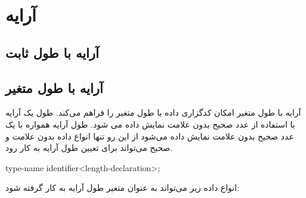 
\chapter{آرایه}

\section{آرایه با طول ثابت}

% 
% 
% 
% 

\section{آرایه با طول متغیر}

آرایه با طول متغیر امکان کدگزاری داده با طول متغیر را فراهم می‌کند.
طول یک آرایه با استفاده از عدد صحیح بدون علامت نمایش داده می شود.
طول آرایه همواره با یک عدد صحیح بدون علامت نمایش داده می‌شود از این رو تنها
انواع داده بدون علامت و صحیح می‌تواند برای تعیین طول آرایه به کار رود.

\begin{C++}
type-name identifier<length-declaration>;
\end{C++}

انواع داده زیر می‌تواند به عنوان متغیر طول آرایه به کار گرفته شود:

